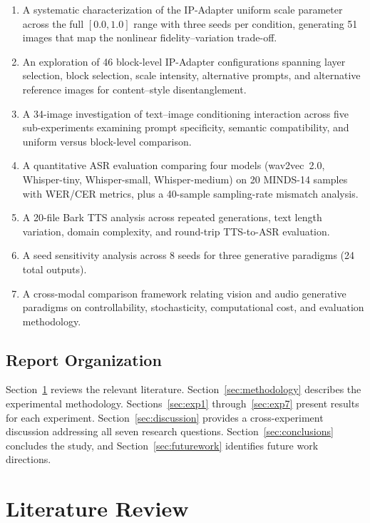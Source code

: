 \documentclass[conference]{IEEEtran}
\newcommand{\ipadapter}{IP-Adapter}
\begin{document}
\begin{enumerate}
    \item A systematic characterization of the \ipadapter{} uniform scale parameter across the full \([0.0, 1.0]\) range with three seeds per condition, generating 51 images that map the nonlinear fidelity--variation trade-off.
    \item An exploration of 46 block-level \ipadapter{} configurations spanning layer selection, block selection, scale intensity, alternative prompts, and alternative reference images for content--style disentanglement.
    \item A 34-image investigation of text--image conditioning interaction across five sub-experiments examining prompt specificity, semantic compatibility, and uniform versus block-level comparison.
    \item A quantitative ASR evaluation comparing four models (wav2vec~2.0, Whisper-tiny, Whisper-small, Whisper-medium) on 20 MINDS-14 samples with WER/CER metrics, plus a 40-sample sampling-rate mismatch analysis.
    \item A 20-file Bark TTS analysis across repeated generations, text length variation, domain complexity, and round-trip TTS-to-ASR evaluation.
    \item A seed sensitivity analysis across 8 seeds for three generative paradigms (24 total outputs).
    \item A cross-modal comparison framework relating vision and audio generative paradigms on controllability, stochasticity, computational cost, and evaluation methodology.
\end{enumerate}

\subsection{Report Organization}

Section~\ref{sec:litreview} reviews the relevant literature. Section~\ref{sec:methodology} describes the experimental methodology. Sections~\ref{sec:exp1} through~\ref{sec:exp7} present results for each experiment. Section~\ref{sec:discussion} provides a cross-experiment discussion addressing all seven research questions. Section~\ref{sec:conclusions} concludes the study, and Section~\ref{sec:futurework} identifies future work directions.

\section{Literature Review}
\label{sec:litreview}
\end{document}

